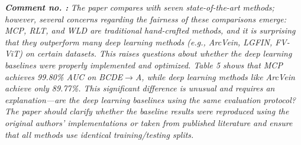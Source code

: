 \documentclass[11pt]{article}
\theoremstyle{remark}
\newcounter{mycounter} %
\newcommand\showReviewcounter{\stepcounter{mycounter}\themycounter}
\begin{document}
\textbf{\textit{Comment no. \showReviewcounter:}} 
\textit{The paper compares with seven state-of-the-art methods; however, several concerns regarding the fairness of these comparisons emerge:
MCP, RLT, and WLD are traditional hand-crafted methods, and it is surprising that they outperform many deep learning methods (e.g., ArcVein, LGFIN, FV-ViT) on certain datasets. This raises questions about whether the deep learning baselines were properly implemented and optimized.
Table 5 shows that MCP achieves 99.80\% AUC on BCDE$\rightarrow$A, while deep learning methods like ArcVein achieve only 89.77\%. This significant difference is unusual and requires an explanation—are the deep learning baselines using the same evaluation protocol?
The paper should clarify whether the baseline results were reproduced using the original authors' implementations or taken from published literature and ensure that all methods use identical training/testing splits.}
\color{black}
\end{document}
